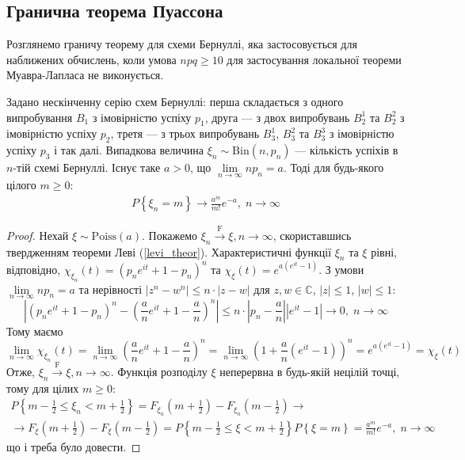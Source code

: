 \subsection{Гранична теорема Пуассона}
Розглянемо граничу теорему для схеми Бернуллі, яка застосовується для наближених обчислень, коли умова $npq \geq 10$ 
для застосування локальної теореми Муавра-Лапласа не виконується.
\begin{theorem*}
    Задано нескінченну серію схем Бернуллі: перша складається з одного випробування $B_1$ з імовірністю успіху $p_1$, 
    друга --- з двох випробувань $B_2^1$ та $B_2^2$ з імовірністю успіху $p_2$, 
    третя --- з трьох випробувань $B_3^1$, $B_3^2$ та $B_3^3$ з імовірністю успіху $p_3$ і так далі.
    Випадкова величина $\xi_n \sim \mathrm{Bin}(n, p_n)$ --- кількість успіхів в $n$-тій схемі Бернуллі.
    Існує таке $a > 0$, що $\underset{n\to\infty}{\lim} n p_n = a$.
    Тоді для будь-якого цілого $m \geq 0$:
    \begin{gather}
        P\left\{\xi_n = m\right\} \to \frac{a^m}{m!} e^{-a}, \; n\to \infty
    \end{gather}
\end{theorem*}
\begin{proof}
    Нехай $\xi \sim \mathrm{Poiss}(a)$. Покажемо $\xi_n \overset{\mathrm{F}}{\longrightarrow} \xi, n\to\infty$, скориставшись твердженням теореми Леві (\ref{levi_theor}).
    Характеристичні функції $\xi_n$ та $\xi$ рівні, відповідно, $\chi_{\xi_n}(t) = \left(p_n e^{it} + 1 - p_n \right)^n$ та $\chi_{\xi}(t) = e^{a\left( e^{it} - 1\right)}$.
    З умови $\underset{n\to\infty}{\lim} n p_n = a$ та нерівності $\left| z^n - w^n\right| \leq n\cdot\left| z - w\right|$ для $z, w \in \mathbb{C}$, $|z|\leq1$, $|w|\leq1$:
    $$
    \left| \left(p_n e^{it} + 1 - p_n \right)^n - \left(\frac{a}{n} e^{it} + 1 - \frac{a}{n} \right)^n\right| \leq
    n \cdot \left| p_n - \frac{a}{n}\right| \left| e^{it} - 1\right| \to 0, \; n\to\infty
    $$
    Тому маємо
    $$
    \underset{n\to\infty}{\lim} \chi_{\xi_n}(t) = \underset{n\to\infty}{\lim} \left(\frac{a}{n} e^{it} + 1 - \frac{a}{n} \right)^n = 
    \underset{n\to\infty}{\lim} \left(1 + \frac{a}{n} \left(e^{it} - 1\right) \right)^n = e^{a\left( e^{it} - 1\right)} = \chi_{\xi}(t)
    $$
    Отже, $\xi_n \overset{\mathrm{F}}{\longrightarrow} \xi, n\to\infty$. Функція розподілу $\xi$ неперервна в будь-якій нецілій точці, тому для цілих $m \geq 0$:
    \begin{gather*}
        P\left\{ m - \frac{1}{2} \leq \xi_n < m + \frac{1}{2}\right\} = F_{\xi_n}\left( m + \frac{1}{2}\right) -
        F_{\xi_n}\left( m - \frac{1}{2}\right) \to \\ \to F_{\xi}\left( m + \frac{1}{2}\right) -
        F_{\xi}\left( m - \frac{1}{2}\right) = P\left\{ m - \frac{1}{2} \leq \xi < m + \frac{1}{2}\right\}
        P\left\{ \xi = m\right\} = \frac{a^m}{m!} e^{-a}, \; n\to \infty
    \end{gather*}
    що і треба було довести.
\end{proof}
